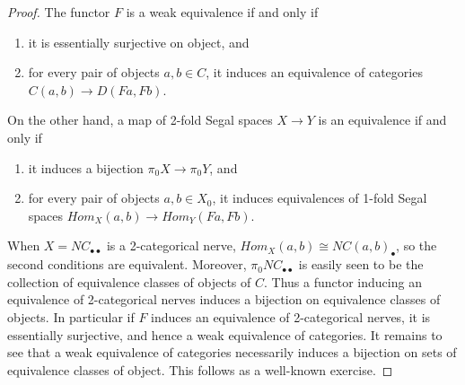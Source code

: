 \documentclass{amsart}
\begin{document}
\begin{proof}
	The functor $F$ is a weak equivalence if and only if 
	\begin{enumerate}
		\item it is essentially surjective on object, and
		\item for every pair of objects $a,b \in C$,  it induces an equivalence of categories $C(a,b) \to D(Fa, Fb)$.
	\end{enumerate}
On the other hand, a map of 2-fold Segal spaces $X \to Y$ is an equivalence if and only if
\begin{enumerate}
	\item it induces a bijection $\pi_0X \to \pi_0Y$, and
	\item for every pair of objects $a,b \in X_0$, it induces equivalences of 1-fold Segal spaces $Hom_X(a,b) \to Hom_Y(Fa, Fb)$.
\end{enumerate}
When $X = NC_{\bullet \bullet}$  is a 2-categorical nerve, $Hom_X(a,b) \cong NC(a,b)_{\bullet}$, so the second conditions are equivalent. Moreover, $\pi_0 NC_{\bullet \bullet}$ is easily seen to be the collection of equivalence classes of objects of $C$. Thus a functor inducing an equivalence of 2-categorical nerves induces a bijection on equivalence classes of objects. In particular if $F$ induces an equivalence of 2-categorical nerves, it is essentially surjective, and hence a weak equivalence of categories. It remains to see that a weak equivalence of categories necessarily induces a bijection on sets of equivalence classes of object. This follows as a well-known exercise.
\end{proof}


\end{document}
